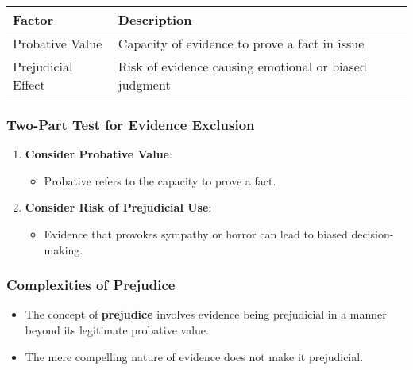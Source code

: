 \begin{longtable}[]{@{}
  >{\raggedright\arraybackslash}p{}
  >{\raggedright\arraybackslash}p{}@{}}
\toprule\noalign{}
\begin{minipage}[b]{\linewidth}\raggedright
Factor
\end{minipage} & \begin{minipage}[b]{\linewidth}\raggedright
Description
\end{minipage} \\
\midrule\noalign{}
\endhead
\bottomrule\noalign{}
\endlastfoot
Probative Value & Capacity of evidence to prove a fact in issue \\
Prejudicial Effect & Risk of evidence causing emotional or biased
judgment \\
\end{longtable}

\subsubsection{Two-Part Test for Evidence
Exclusion}\label{two-part-test-for-evidence-exclusion}

\begin{enumerate}
\def\labelenumi{\arabic{enumi}.}
\tightlist
\item
  \textbf{Consider Probative Value}:

  \begin{itemize}
  \tightlist
  \item
    Probative refers to the capacity to prove a fact.
  \end{itemize}
\item
  \textbf{Consider Risk of Prejudicial Use}:

  \begin{itemize}
  \tightlist
  \item
    Evidence that provokes sympathy or horror can lead to biased
    decision-making.
  \end{itemize}
\end{enumerate}

\subsubsection{Complexities of
Prejudice}\label{complexities-of-prejudice}

\begin{itemize}
\tightlist
\item
  The concept of \textbf{prejudice} involves evidence being prejudicial
  in a manner beyond its legitimate probative value.
\item
  The mere compelling nature of evidence does not make it prejudicial.
\end{itemize}

